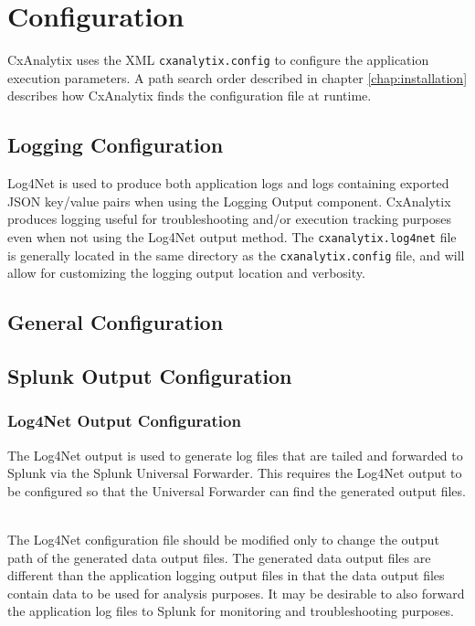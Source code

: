 \chapter{Configuration}\label{chap:configuration}


CxAnalytix uses the XML \texttt{cxanalytix.config} to configure the application execution parameters.  A path search order described in chapter \ref{chap:installation}
describes how CxAnalytix finds the configuration file at runtime.

\section{Logging Configuration}

Log4Net is used to produce both application logs and logs containing exported JSON key/value pairs when using the Logging Output component. 
CxAnalytix produces logging useful for troubleshooting and/or execution tracking purposes even when not using the Log4Net output method.  The 
\texttt{cxanalytix.log4net} file is generally located in the same directory as the \texttt{cxanalytix.config} file, and will allow for
customizing the logging output location and verbosity.




\section{General Configuration}\label{sec:general}


\section{Splunk Output Configuration}\label{sec:splunk_config}
\subsection{Log4Net Output Configuration}

The Log4Net output is used to generate log files that are tailed and forwarded to Splunk via the Splunk Universal Forwarder.  This requires the Log4Net
output to be configured so that the Universal Forwarder can find the generated output files.

\noindent\\The Log4Net configuration file should be modified only to change the output path of the generated data output files.  The generated data output files are different
than the application logging output files in that the data output files contain data to be used for analysis purposes. It may be desirable to also forward
the application log files to Splunk for monitoring and troubleshooting purposes.

